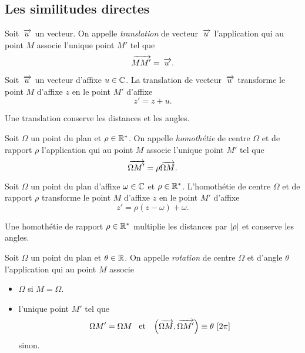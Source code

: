 \documentclass{magnolia}
\begin{document}
\subsection{Les similitudes directes}

\begin{definition}
Soit $\kern 2pt\overrightarrow{\kern -2ptu}$ un vecteur. On appelle \emph{translation} de vecteur $\kern 2pt\overrightarrow{\kern -2ptu}$ l'application qui au point $M$ associe l'unique point $M'$ tel que
\[\kern 2pt\overrightarrow{\kern -2ptMM'}=\kern 2pt\overrightarrow{\kern -2ptu}.\]
\end{definition}

\begin{proposition}
Soit $\kern 2pt\overrightarrow{\kern -2ptu}$ un vecteur d'affixe $u\in\mathbb{C}$. La translation de vecteur $\kern 2pt\overrightarrow{\kern -2ptu}$ transforme le point $M$ d'affixe $z$ en le point $M'$ d'affixe
\[z'=z+u.\]
\end{proposition}

\begin{remarqueUnique}
\remarque Une translation conserve les distances et les angles.
\end{remarqueUnique}

\begin{definition}
Soit $\Omega$ un point du plan et $\rho\in{\mathbb{R}^*}$. On appelle \emph{homothétie} de centre $\Omega$ et de rapport $\rho$ l'application qui au point $M$ associe l'unique point $M'$ tel que
\[\kern 2pt\overrightarrow{\kern -2pt\Omega M'}=\rho\kern 2pt\overrightarrow{\kern -2pt\Omega M}.\]
\end{definition}

\begin{proposition}
Soit $\Omega$ un point du plan d'affixe $\omega\in\mathbb{C}$ et $\rho\in{\mathbb{R}^*}$. L'homothétie de centre $\Omega$ et de rapport $\rho$ transforme le point $M$ d'affixe $z$ en le point $M'$ d'affixe
\[z'=\rho(z-\omega)+\omega.\]
\end{proposition}

\begin{remarqueUnique}
\remarque Une homothétie de rapport $\rho\in{\mathbb{R}^*}$ multiplie les distances par $\left|\rho\right|$
	et conserve les angles.
\end{remarqueUnique}

\begin{definition}
Soit $\Omega$ un point du plan et $\theta\in\mathbb{R}$. On appelle \emph{rotation} de centre $\Omega$ et d'angle $\theta$ l'application qui au point $M$ associe
\begin{itemize}
\item $\Omega$ si $M=\Omega$.
\item l'unique point $M'$ tel que
  \[\Omega M'=\Omega M \quad\!\text{et}\quad\! \left(\kern 2pt\overrightarrow{\kern -2pt\Omega M}, \kern 2pt\overrightarrow{\kern -2pt\Omega M'}\right)\equiv\theta\,\left[2\pi\right]\]
  sinon.
\end{itemize}
\end{definition}
\end{document}
